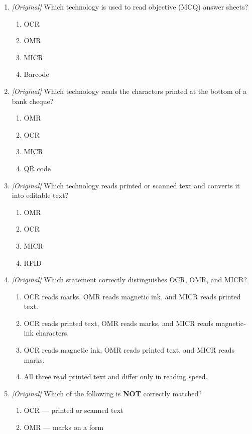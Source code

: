 \documentclass[11pt]{article}
\begin{document}
\begin{enumerate}[label=\textbf{Q\arabic*.}, leftmargin=*]
\item \textit{[Original]} Which technology is used to read objective (MCQ)
  answer sheets?
  \begin{enumerate}[label=\Alph*.]
    \item OCR
    \item OMR
    \item MICR
    \item Barcode
  \end{enumerate}
\item \textit{[Original]} Which technology reads the characters printed at
  the bottom of a bank cheque?
  \begin{enumerate}[label=\Alph*.]
    \item OMR
    \item OCR
    \item MICR
    \item QR code
  \end{enumerate}
\item \textit{[Original]} Which technology reads printed or scanned text and
  converts it into editable text?
  \begin{enumerate}[label=\Alph*.]
    \item OMR
    \item OCR
    \item MICR
    \item RFID
  \end{enumerate}
\item \textit{[Original]} Which statement correctly distinguishes OCR, OMR,
  and MICR?
  \begin{enumerate}[label=\Alph*.]
    \item OCR reads marks, OMR reads magnetic ink, and MICR reads printed
      text.
    \item OCR reads printed text, OMR reads marks, and MICR reads
      magnetic-ink characters.
    \item OCR reads magnetic ink, OMR reads printed text, and MICR reads
      marks.
    \item All three read printed text and differ only in reading speed.
  \end{enumerate}
\item \textit{[Original]} Which of the following is \textbf{NOT} correctly
  matched?
  \begin{enumerate}[label=\Alph*.]
    \item OCR --- printed or scanned text
    \item OMR --- marks on a form

\end{enumerate}
\end{enumerate}
\end{document}
